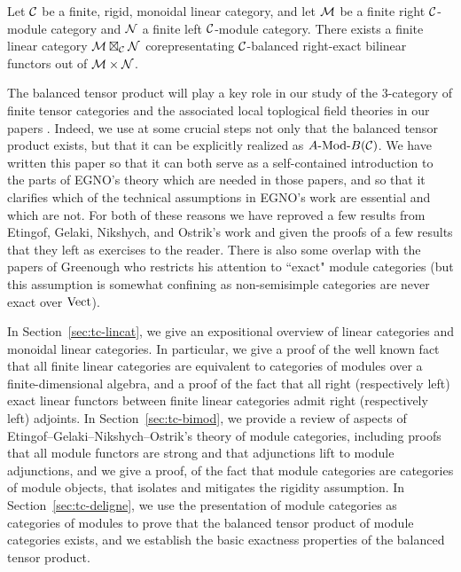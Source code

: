 \documentclass{amsart}
\begin{document}
\begin{theorem*}
Let $\mathcal C$ be a finite, rigid, monoidal linear category, and let $\mathcal M$ be a finite right $\mathcal C$-module category and $\mathcal N$ a finite left $\mathcal C$-module category.  There exists a finite linear category $\mathcal M \boxtimes_\mathcal C \mathcal N$ corepresentating $\mathcal C$-balanced right-exact bilinear functors out of $\mathcal M \times \mathcal N$.
\end{theorem*}

The balanced tensor product will play a key role in our study of the $3$-category of finite tensor categories and the associated local toplogical field theories in our papers \cite{3TC, DTCI}.  Indeed, we use at some crucial steps not only that the balanced tensor product exists, but that it can be explicitly realized as $\Mod{A}{B}(\cC)$.  We have written this paper so that it can both serve as a self-contained introduction to the parts of EGNO's theory which are needed in those papers, and so that it clarifies which of the technical assumptions in EGNO's work are essential and which are not.  For both of these reasons we have reproved a few results from Etingof, Gelaki, Nikshych, and Ostrik's work and given the proofs of a few results that they left as exercises to the reader.  There is also some overlap with the papers of Greenough \cite{MR2678824, 1102.3411} who restricts his attention to ``exact" module categories (but this assumption is somewhat confining as non-semisimple categories are never exact over $\mathrm{Vect}$).

In Section~\ref{sec:tc-lincat}, we give an expositional overview of linear categories and monoidal linear categories.  In particular, we give a proof of the well known fact that all finite linear categories are equivalent to categories of modules over a finite-dimensional algebra, and a proof of the fact that all right (respectively left) exact linear functors between finite linear categories admit right (respectively left) adjoints.  In Section~\ref{sec:tc-bimod}, we provide a review of aspects of Etingof--Gelaki--Nikshych--Ostrik's theory of module categories, including proofs that all module functors are strong and that adjunctions lift to module adjunctions, and we give a proof, of the fact that module categories are categories of module objects, that isolates and mitigates the rigidity assumption.  In Section~\ref{sec:tc-deligne}, we use the presentation of module categories as categories of modules to prove that the balanced tensor product of module categories exists, and we establish the basic exactness properties of the balanced tensor product.
\end{document}
